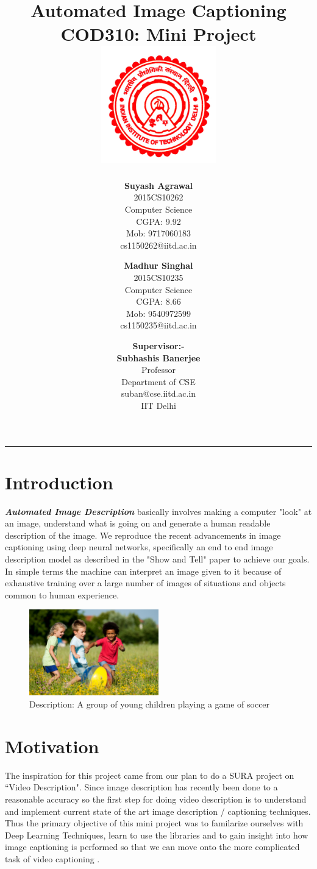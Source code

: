 \documentclass[11pt]{article}
\title{\vspace*{\fill} \textbf{Automated Image Captioning}
	  \\ {\large \textbf{COD310: Mini Project}}
	  \\  \vspace{3mm} \includegraphics[width=5cm]{logo.jpg}}
\author{
	\textbf{Suyash Agrawal}\\ 
	2015CS10262\\
	Computer Science\\
	CGPA: 9.92 \\
	Mob: 9717060183\\
	cs1150262@iitd.ac.in
	\and
	\textbf{Madhur Singhal}\\ 
	2015CS10235\\
	Computer Science\\
	CGPA: 8.66\\
	Mob: 9540972599\\
	cs1150235@iitd.ac.in
}
\date{\textbf{Supervisor:-} \\ \textbf{Subhashis Banerjee} \\ Professor \\ Department of CSE \\ suban@cse.iitd.ac.in\\ IIT Delhi\\
\vspace*{\fill}}
\begin{document}
	\maketitle

\begin{center}
\noindent\rule{3.2cm}{0.4pt} 
\end{center}

	\newpage
	
	\section{Introduction}
	\textit{\textbf{Automated Image Description}} basically involves making a computer "look" at an image, understand what is going on and generate a human readable description of the image. We reproduce the recent advancements in image captioning using deep neural networks, specifically an end to end image description model as described in the "Show and Tell" paper to achieve our goals. In simple terms the machine can interpret an image given to it because of exhaustive training over a large number of images of situations and objects common to human experience.
	
	\begin{figure}[h]
	\centering
	\includegraphics[width=0.5\textwidth]{children.jpeg}
	\caption{Description: A group of young children playing a game of soccer}
	\centering
	\end{figure}


	\section{Motivation}

The inspiration for this project came from our plan to do a SURA project on ``Video Description". Since image description has recently been done to a reasonable accuracy so the first step for doing video description is to understand and implement current state of the art image description / captioning techniques. Thus the primary objective of this mini project was to familarize ourselves with Deep Learning Techniques, learn to use the libraries and to gain insight into how image captioning is performed so that we can move onto the more complicated task of video captioning .	
\end{document}
